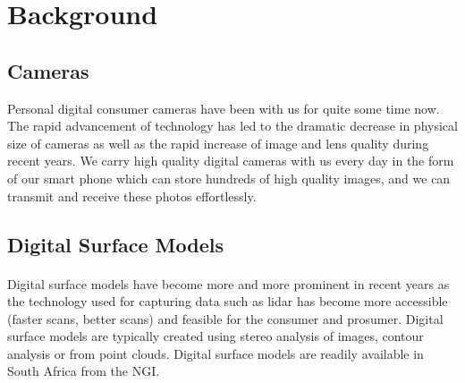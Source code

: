 \section{Background}
\subsection{Cameras}
Personal digital consumer cameras have been with us for quite some time now. The rapid advancement of technology has led to the dramatic decrease in physical size of cameras as well as the rapid increase of image and lens quality during recent years. We carry high quality digital cameras with us every day in the form of our smart phone which can store hundreds of high quality images, and we can transmit and receive these photos effortlessly.

\subsection{Digital Surface Models}
\paragraph{}
Digital surface models have become more and more prominent in recent years as the technology used for capturing data such as lidar has become more accessible (faster scans, better scans) and feasible for the consumer and prosumer. Digital surface models are typically created using stereo analysis of images, contour analysis or from point clouds. Digital surface models are readily available in South Africa from the NGI.